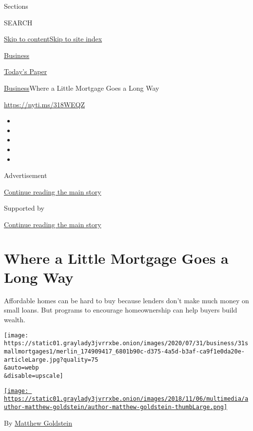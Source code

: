 Sections

SEARCH

\protect\hyperlink{site-content}{Skip to
content}\protect\hyperlink{site-index}{Skip to site index}

\href{https://www.nytimes3xbfgragh.onion/section/business}{Business}

\href{https://myaccount.nytimes3xbfgragh.onion/auth/login?response_type=cookie\&client_id=vi}{}

\href{https://www.nytimes3xbfgragh.onion/section/todayspaper}{Today's
Paper}

\href{/section/business}{Business}\textbar{}Where a Little Mortgage Goes
a Long Way

\url{https://nyti.ms/318WEQZ}

\begin{itemize}
\item
\item
\item
\item
\item
\end{itemize}

Advertisement

\protect\hyperlink{after-top}{Continue reading the main story}

Supported by

\protect\hyperlink{after-sponsor}{Continue reading the main story}

\hypertarget{where-a-little-mortgage-goes-a-long-way}{%
\section{Where a Little Mortgage Goes a Long
Way}\label{where-a-little-mortgage-goes-a-long-way}}

Affordable homes can be hard to buy because lenders don't make much
money on small loans. But programs to encourage homeownership can help
buyers build wealth.

\texttt{[image: https://static01.graylady3jvrrxbe.onion/images/2020/07/31/business/31smallmortgages1/merlin\_174909417\_6801b90c-d375-4a5d-b3af-ca9f1e0da20e-articleLarge.jpg?quality=75\\\&auto=webp\\\&disable=upscale]}

\href{https://www.nytimes3xbfgragh.onion/by/matthew-goldstein}{\texttt{[image: https://static01.graylady3jvrrxbe.onion/images/2018/11/06/multimedia/author-matthew-goldstein/author-matthew-goldstein-thumbLarge.png]}}

By
\href{https://www.nytimes3xbfgragh.onion/by/matthew-goldstein}{Matthew
Goldstein}

